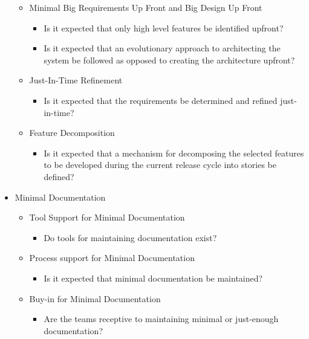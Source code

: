 \begin{itemize}
		\begin{itemize}
			\item Minimal Big Requirements Up Front and Big Design Up Front
				\begin{itemize}
					\item Is it expected that only high level features be identified upfront?
					\item Is it expected that an evolutionary approach to architecting the system be followed as opposed to creating the architecture upfront?
				\end{itemize}
			\item Just-In-Time Refinement
				\begin{itemize}
					\item Is it expected that the requirements be determined and refined just-in-time?
				\end{itemize}
			\item Feature Decomposition
				\begin{itemize}
					\item Is it expected that a mechanism for decomposing the selected features to be developed during the current release cycle into stories be defined?
				\end{itemize}
		\end{itemize}
	\item Minimal Documentation
		\begin{itemize}
			\item Tool Support for Minimal Documentation
				\begin{itemize}
					\item Do tools for maintaining documentation exist?
				\end{itemize}
			\item Process support for Minimal Documentation
				\begin{itemize}
					\item Is it expected that minimal documentation be maintained?
				\end{itemize}
			\item Buy-in for Minimal Documentation
				\begin{itemize}
					\item Are the teams receptive to maintaining minimal or just-enough documentation?
				\end{itemize}
		\end{itemize}
\end{itemize}





